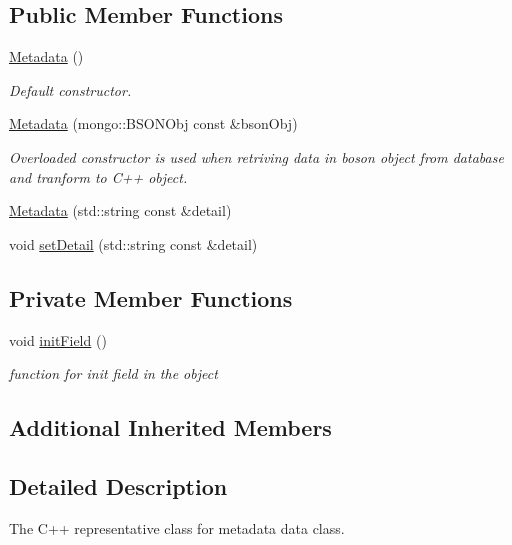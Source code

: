 \subsection*{Public Member Functions}
\begin{DoxyCompactItemize}
\item 
\hyperlink{classunisys_1_1Metadata_ad7af6c07ed0468c73e95a6e2571dba7f}{Metadata} ()
\begin{DoxyCompactList}\small\item\em Default constructor. \end{DoxyCompactList}\item 
\hyperlink{classunisys_1_1Metadata_a1becaf51b053c7c56a2da80d16050df3}{Metadata} (mongo\-::\-B\-S\-O\-N\-Obj const \&bson\-Obj)
\begin{DoxyCompactList}\small\item\em Overloaded constructor is used when retriving data in boson object from database and tranform to C++ object. \end{DoxyCompactList}\item 
\hyperlink{classunisys_1_1Metadata_a49b8011f336589cbc6bb08f3de5553ec}{Metadata} (std\-::string const \&detail)
\item 
void \hyperlink{classunisys_1_1Metadata_a65b8a94185f02d033e9b5ab90dd77853}{set\-Detail} (std\-::string const \&detail)
\end{DoxyCompactItemize}
\subsection*{Private Member Functions}
\begin{DoxyCompactItemize}
\item 
void \hyperlink{classunisys_1_1Metadata_a5c3596b451d9539846f8f6ed7bfceaf9}{init\-Field} ()
\begin{DoxyCompactList}\small\item\em function for init field in the object \end{DoxyCompactList}\end{DoxyCompactItemize}
\subsection*{Additional Inherited Members}


\subsection{Detailed Description}
The C++ representative class for metadata data class. 

